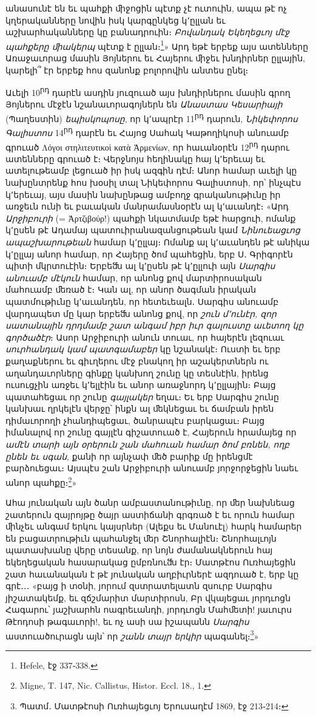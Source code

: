 \documentclass{article}
\begin{document}
{անասունէ են եւ պահքի ﬕջոցին պէտք չէ ուտուին, ապա թէ ոչ կղերականները նովին իսկ կարգընկեց կ՚ըլլան եւ աշխարհականները կը բանադրուին։ \emph{Բովանդակ Եկեղեցւոյ մէջ պահքերը ﬕակերպ} պէտք է ըլլան։\footnote{Hefele, էջ 337֊338.}» Արդ եթէ երբեք այս ատենները Առաջաւորաց մասին Յոյներու եւ Հայերու ﬕջեւ խնդիրներ ըլլային, կարելի՞ էր երբեք հոս զանոնք բոլորովին անտես ընել։

Աւելի 10\textsuperscript{րդ} դարէն ասդին յուզուած այս խնդիրներու մասին գրող Յոյներու մէջէն նշանաւորագոյներն են \emph{Անաստաս Կեսարիայի} (Պաղեստին) \emph{եպիսկոպոսը}, որ կ՚ապրէր 11\textsuperscript{րդ} դարուն, \emph{Նիկեփորոս Գալիստոս} 14\textsuperscript{րդ} դարէն եւ Հայոց Սահակ Կաթողիկոսի անուամբ գրուած Λόγοι στηλιτευτικοὶ κατὰ Ἀρμενίων, որ հաւանօրէն 12\textsuperscript{րդ} դարու ատենները գրուած է։ Վերջնոյս հեղինակը հայ կ՚երեւայ եւ ատելութեամբ լեցուած իր իսկ ազգին դէմ։ Անոր համար աւելի կը նախընտրենք հոս խօսիլ տալ Նիկեփորոս Գալիստոսի, որ՝ ինչպէս կ՚երեւայ, այս մասին նախընթաց ամբողջ գրականութիւնը իր առջեւն ունի եւ բաւական մանրամասնօրէն ալ կ՚աւանդէ։ «Արդ \emph{Արջիբուրի} (= Ἀρτζιβούρ!) պահքի նկատմամբ եթէ հարցուի, ոմանք կ՚ըսեն թէ Ադամայ պատուիրանազանցութեան կամ \emph{Նինուեացւոց ապաշխարութեան} համար կ՚ըլլայ։ Ոմանք ալ կ՚աւանդեն թէ անիկա կ՚ըլլայ անոր համար, որ Հայերը ծոմ պահեցին, երբ Ս․ Գրիգորէն պիտի մկրտուէին։ Երբեﬓ ալ կ՚ըսեն թէ կ՚ըլլուի այն \emph{Սարգիս անուամբ մէկուն} համար, որ անոնց քով մարտիրոսական մահուամբ ﬔռած է։ Կան ալ, որ անոր ծագման իրական պատմութիւնը կ՚աւանդեն, որ հետեւեալն․ Սարգիս անուամբ վարդապետ մը կար երբեﬓ անոնց քով, որ \emph{շուն մ՚ունէր, զոր սատանային դրդմամբ շատ անգամ իբր իւր գալուստը աւետող կը գործածէր}։ Ասոր Արջիբուրի անուն տուաւ, որ հայերէն լեզուաւ \emph{սուրհանդակ կամ պատգամաբեր} կը նշանակէ։ Ուստի եւ երբ քաղաքներու եւ գիւղերու մէջ բնակող իր աշակերտներն ու աղանդաւորները գինքը կանխող շունը կը տեսնէին, իրենց ուսուցչին առջեւ կ՚ելլէին եւ անոր առաջնորդ կ՚ըլլային։ Բայց պատահեցաւ որ շունը \emph{գայլակեր} եղաւ։ Եւ երբ Սարգիս շունը կանխաւ ղրկելէն վերջը՝ ինքն ալ ﬔկնեցաւ եւ ճամբան իրեն դիմաւորողի չհանդիպեցաւ, ծանրապէս բարկացաւ։ Բայց իմանալով որ շունը գայլէն գիշատուած է, Հայերուն հրամայեց որ \emph{ամէն տարի այն օրերուն շան մահուան համար ծոմ բռնեն, ողբ ընեն եւ սգան}, քանի որ այնչափ ﬔծ բարիք մը իրենցմէ բարձուեցաւ։ Այսպէս շան Արջիբուրի անուամբ յորջորջեցին նաեւ անոր պահքը։\footnote{Migne, T. 147, Nic. Callistus, Histor. Eccl. 18., 1.}»

Ահա յունական այն ծանր ամբաստանութիւնը, որ ﬔր նախնեաց շատերուն զայրոյթը ծայր աստիճանի գրգռած է եւ որուն համար ﬕնչեւ անգամ երկու կայսրներ (Ալեքս եւ Մանուէլ) հարկ համարեր են բացատրութիւն պահանջել ﬔր Շնորհալիէն։ Շնորհալւոյն պատասխանը վերը տեսանք, որ նոյն ժամանակներուն հայ եկեղեցական հասարակաց ըմբռնուﬓ էր։ Մատթէոս Ուռհայեցին շատ հաւանական է թէ յունական աղբիւրներէ ազդուած է, երբ կը գրէ․․․ «բայց ի տօնի, յորում զստրատելատն զսուրբ Սարգիս յիշատակեմք, եւ զճշմարիտ մարտիրոսն, Բր վկայեցաւ յորդւոցն Հագարու՝ յաշխարհն ոագրեւանդի, յորդւոցն Մահﬔտի! յաւուրս Թէոդոսի թագաւորի!, եւ ոչ ասի սա իշապանն \emph{Սարգիս} աստուածուրացն այն՝ որ \emph{շանն տայր երկիր} պագանել։\footnote{Պատմ․ Մատթէոսի Ուռհայեցւոյ Երուսաղէմ 1869, էջ 213֊214։}»

}
\end{document}
